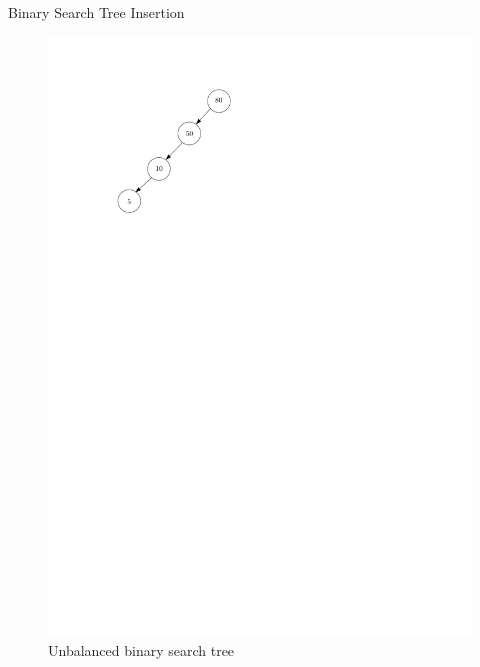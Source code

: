 \documentclass[11pt]{article}
\theoremstyle{definition}
\begin{document}
    \begin{algorithm}[H]
        \caption{Binary Search Tree Insertion}\label{Tree:insertion}
        \begin{algorithmic}[1]
            \State {}
            \State {}
            \State {}
            \State {}
        \end{algorithmic}
    \end{algorithm}
    
    \begin{figure}[tbh]
        \centering
        \includegraphics[scale=0.8]{figures/unbalancedbt.pdf}
        \caption{Unbalanced binary search tree}
        \label{fig:unbalancedBT}
    \end{figure}
\end{document}
